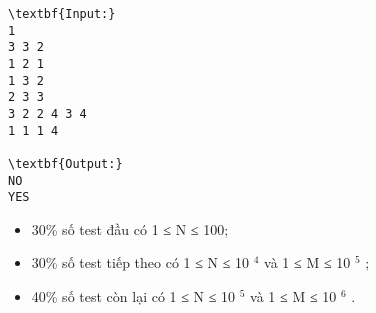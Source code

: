 \begin{verbatim}
\textbf{Input:}
1
3 3 2
1 2 1
1 3 2
2 3 3
3 2 2 4 3 4
1 1 1 4

\textbf{Output:}
NO
YES\end{verbatim}
\begin{itemize}
	\item 30\% số test đầu có 1 ≤ N ≤ 100;
	\item 30\% số test tiếp theo có 1 ≤ N ≤ 10 $^ 4 $ và 1 ≤ M ≤ 10 $^ 5 $ ;
	\item 40\% số test còn lại có 1 ≤ N ≤ 10 $^ 5 $ và 1 ≤ M ≤ 10 $^ 6 $ .
\end{itemize}